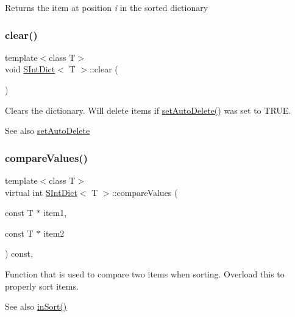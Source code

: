 Returns the item at position {\itshape i} in the sorted dictionary \mbox{\label{class_s_int_dict_ab86a29e18447f3f5347bb29478a2e8f4}} 
\subsubsection{\texorpdfstring{clear()}{clear()}}
{\footnotesize\ttfamily template$<$class T$>$ \\
void \mbox{\hyperlink{class_s_int_dict}{S\+Int\+Dict}}$<$ T $>$\+::clear (\begin{DoxyParamCaption}{ }\end{DoxyParamCaption})\hspace{0.3cm}{\ttfamily [inline]}}

Clears the dictionary. Will delete items if \mbox{\hyperlink{class_s_int_dict_aa847c843b8f2509d2021d8db470aa14f}{set\+Auto\+Delete()}} was set to {\ttfamily T\+R\+UE}. \begin{DoxySeeAlso}{See also}
\mbox{\hyperlink{class_s_int_dict_aa847c843b8f2509d2021d8db470aa14f}{set\+Auto\+Delete}} 
\end{DoxySeeAlso}
\mbox{\label{class_s_int_dict_a9c43e81469aa5e458aa7eb82f4217d10}} 
\subsubsection{\texorpdfstring{compareValues()}{compareValues()}}
{\footnotesize\ttfamily template$<$class T$>$ \\
virtual int \mbox{\hyperlink{class_s_int_dict}{S\+Int\+Dict}}$<$ T $>$\+::compare\+Values (\begin{DoxyParamCaption}\item[{const T $\ast$}]{item1,  }\item[{const T $\ast$}]{item2 }\end{DoxyParamCaption}) const\hspace{0.3cm}{\ttfamily [inline]}, {\ttfamily [virtual]}}

Function that is used to compare two items when sorting. Overload this to properly sort items. \begin{DoxySeeAlso}{See also}
\mbox{\hyperlink{class_s_int_dict_a16cc84888ede2d895d4df0323608862d}{in\+Sort()}} 
\end{DoxySeeAlso}
\mbox{\label{class_s_int_dict_aed64f84f475ba2ebec343935f8e7bc6c}} 
